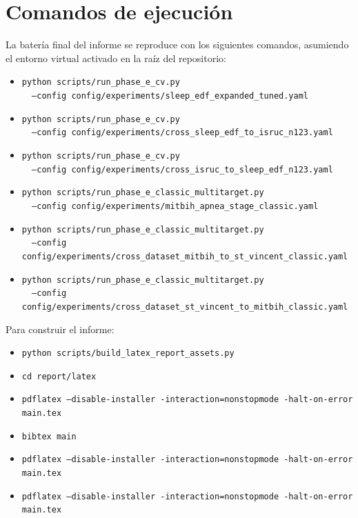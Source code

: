\section{Comandos de ejecuci\'on}

La bater\'ia final del informe se reproduce con los siguientes comandos, asumiendo el entorno virtual activado en la ra\'iz del repositorio:

\begin{itemize}[leftmargin=*]
\item \texttt{python scripts/run\_phase\_e\_cv.py}\\
\texttt{\ \ --config config/experiments/sleep\_edf\_expanded\_tuned.yaml}
\item \texttt{python scripts/run\_phase\_e\_cv.py}\\
\texttt{\ \ --config config/experiments/cross\_sleep\_edf\_to\_isruc\_n123.yaml}
\item \texttt{python scripts/run\_phase\_e\_cv.py}\\
\texttt{\ \ --config config/experiments/cross\_isruc\_to\_sleep\_edf\_n123.yaml}
\item \texttt{python scripts/run\_phase\_e\_classic\_multitarget.py}\\
\texttt{\ \ --config config/experiments/mitbih\_apnea\_stage\_classic.yaml}
\item \texttt{python scripts/run\_phase\_e\_classic\_multitarget.py}\\
\texttt{\ \ --config config/experiments/cross\_dataset\_mitbih\_to\_st\_vincent\_classic.yaml}
\item \texttt{python scripts/run\_phase\_e\_classic\_multitarget.py}\\
\texttt{\ \ --config config/experiments/cross\_dataset\_st\_vincent\_to\_mitbih\_classic.yaml}
\end{itemize}

Para construir el informe:

\begin{itemize}[leftmargin=*]
\item \texttt{python scripts/build\_latex\_report\_assets.py}
\item \texttt{cd report/latex}
\item \texttt{pdflatex --disable-installer -interaction=nonstopmode -halt-on-error main.tex}
\item \texttt{bibtex main}
\item \texttt{pdflatex --disable-installer -interaction=nonstopmode -halt-on-error main.tex}
\item \texttt{pdflatex --disable-installer -interaction=nonstopmode -halt-on-error main.tex}
\end{itemize}

